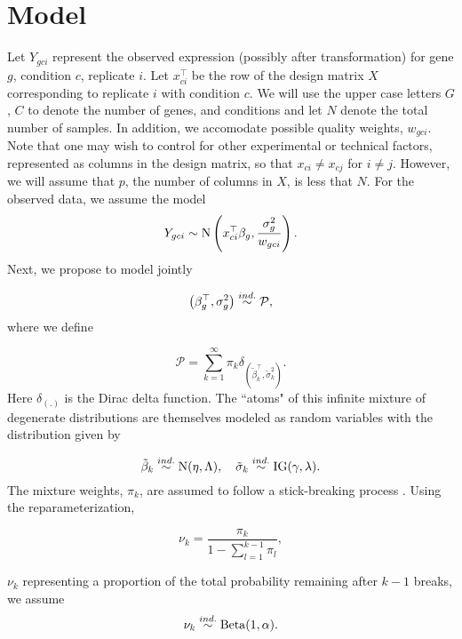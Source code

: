\section{Model}
\label{sec:model}
Let $Y_{gci}$ represent the observed expression (possibly after transformation) for gene $g$, condition $c$, replicate $i$. Let $x_{ci}^\top$ be the row of the design matrix $X$ corresponding to replicate $i$ with condition $c$. We will use the upper case letters $G$, $C$ to denote the number of genes, and conditions and let $N$ denote the total number of samples. In addition, we accomodate possible quality weights, $w_{gci}$.  Note that one may wish to control for other experimental or technical factors, represented as columns in the design matrix, so that $x_{ci} \neq x_{cj}$ for $i \neq j$. However, we will assume that $p$,  the number of columns in $X$, is less that $N$. For the observed data, we assume the model
\begin{equation}
Y_{gci} \sim \operatorname{N} \left( x_{ci}^\top \beta_g, \frac{\sigma^2_g}{w_{gci}} \right).
\end{equation}
Next, we propose to model jointly

\begin{equation}
\left(\beta_g^\top,\sigma^2_g\right) \stackrel{ind.}{\sim} \mathcal{P},
\end{equation}
where we define

\begin{equation}
\mathcal{P} =\sum_{k=1}^\infty \pi_k \delta_{\left(\tilde{\beta}_k^\top ,\tilde{\sigma}^2_k\right)}.
\end{equation}
Here $\delta_{(.)}$ is the Dirac delta function. The ``atoms" of this infinite mixture of degenerate distributions are themselves modeled as random variables with the distribution given by

\begin{equation}
\tilde{\beta}_k \stackrel{ind.}{\sim} \operatorname{N}(\eta, \Lambda),\quad \tilde{\sigma}_k \stackrel{ind.}{\sim} \operatorname{IG}(\gamma, \lambda).
\end{equation}
The mixture weights, $\pi_k$,  are assumed to follow a stick-breaking process \citep{sethuraman}. Using the reparameterization,

\begin{equation}
\nu_k = \frac{\pi_k}{1 - \sum_{l=1}^{k-1} \pi_l},
\end{equation}

$\nu_k$ representing a proportion of the total probability remaining after $k-1$ breaks, we assume
\begin{equation}
\nu_k \stackrel{ind.}{\sim} \operatorname{Beta}(1, \alpha).
\end{equation}

